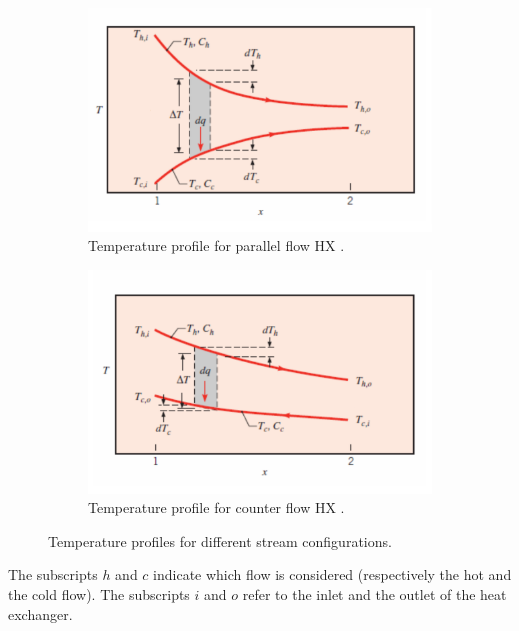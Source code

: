 \begin{figure}[h]
    \centering
    \begin{subfigure}[b]{0.4\textwidth}
        \centering
        \includegraphics[width=\textwidth]{parallele_flow_T}
        \caption{Temperature profile for parallel flow HX \cite{Ngendakumana2018}.}
        \label{fig:C4_HX_par_flow_T}
    \end{subfigure}
    \begin{subfigure}[b]{0.4\textwidth}
        \centering
        \includegraphics[width=\textwidth]{opposite_flow_T}
        \caption{Temperature profile for counter flow HX \cite{Ngendakumana2018}.}
        \label{fig:C4_HX_opo_flow_T}
    \end{subfigure}
    \caption{Temperature profiles for different stream configurations.}
    \label{fig:C4_Tprof}
\end{figure}

The subscripts $h$ and $c$ indicate which flow is considered (respectively the hot and the cold flow). The subscripts $i$ and $o$ refer to the inlet and the outlet of the heat exchanger.

